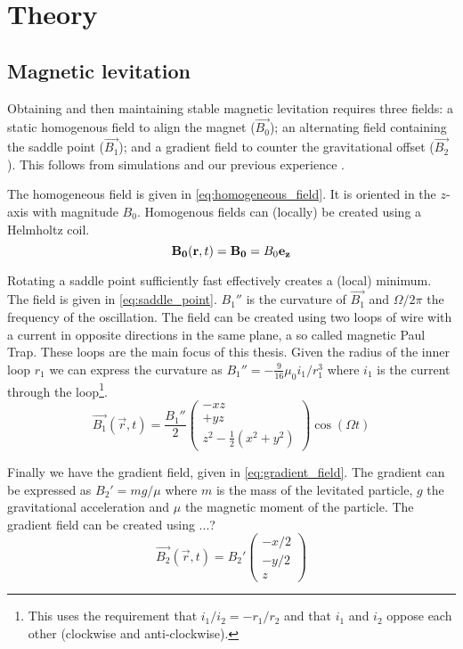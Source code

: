 \chapter{Theory}
\label{chap:theory}

\section{Magnetic levitation}
\label{sec:magnetic_levitation}
Obtaining and then maintaining stable magnetic levitation requires three fields: a static homogenous field to align the magnet ($\vec{B_0}$); an alternating field containing the saddle point ($\vec{B_1}$); and a gradient field to counter the gravitational offset ($\vec{B_2}$). This follows from simulations and our previous experience \cite{perdriat,mart,eli}.

The homogeneous field is given in \autoref{eq:homogeneous_field}. It is oriented in the $z$-axis with magnitude $B_0$. Homogenous fields can (locally) be created using a Helmholtz coil.
\begin{equation}
    \mathbf{B_0}(\mathbf{r}, t) = \mathbf{B_0} = B_0 \mathbf{e_z}
    \label{eq:homogeneous_field}
\end{equation}

Rotating a saddle point sufficiently fast effectively creates a (local) minimum. The field is given in \autoref{eq:saddle_point}. $B_1''$ is the curvature of $\vec{B_1}$ and $\Omega / 2\pi$ the frequency of the oscillation. The field can be created using two loops of wire with a current in opposite directions in the same plane, a so called magnetic Paul Trap. These loops are the main focus of this thesis. Given the radius of the inner loop $r_1$ we can express the curvature as $B_1'' = -\frac{9}{16}\mu_0i_1/r_1^3$ where $i_1$ is the current through the loop\footnote{This uses the requirement that $i_1/i_2 = -r_1/r_2$ and that $i_1$ and $i_2$ oppose each other (clockwise and anti-clockwise).}.
\begin{equation}
    \vec{B_1}(\vec{r}, t) = \frac{B_1''}{2} \begin{pmatrix}
        -xz \\
        +yz \\
        z^2 - \frac{1}{2}(x^2 + y^2)
    \end{pmatrix} \cos(\Omega t)
    \label{eq:saddle_point}
\end{equation}

Finally we have the gradient field, given in \autoref{eq:gradient_field}. The gradient can be expressed as $B_2' = mg/\mu$ where $m$ is the mass of the levitated particle, $g$ the gravitational acceleration and $\mu$ the magnetic moment of the particle. The gradient field can be created using ...?
\begin{equation}
    \vec{B_2}(\vec{r}, t) = B_2' \begin{pmatrix}
        -x / 2 \\
        -y / 2 \\
        z
    \end{pmatrix}
    \label{eq:gradient_field}
\end{equation}
